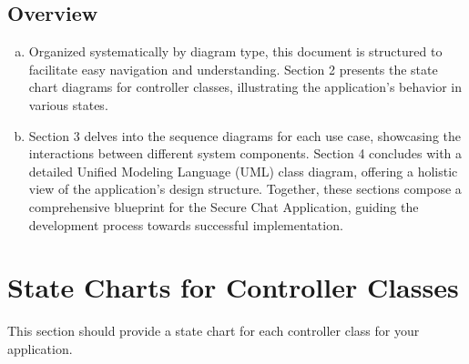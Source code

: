 \documentclass[]{article}
\begin{document}
\subsection{Overview}
\label{sub:overview}
\begin{enumerate}[a)]
    \item Organized systematically by diagram type, this document is structured to facilitate easy navigation and understanding. Section 2 presents the state chart diagrams for controller classes, illustrating the application's behavior in various states.
    \item Section 3 delves into the sequence diagrams for each use case, showcasing the interactions between different system components. Section 4 concludes with a detailed Unified Modeling Language (UML) class diagram, offering a holistic view of the application's design structure. Together, these sections compose a comprehensive blueprint for the Secure Chat Application, guiding the development process towards successful implementation.
\end{enumerate}



\section{State Charts for Controller Classes}
\label{sec:state_charts_for_controller_classes}
This section should provide a state chart for each controller class for your application.
\end{document}
